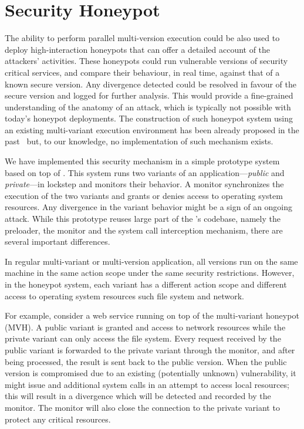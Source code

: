 \section{Security Honeypot}
\label{sec:honeypot}

The ability to perform parallel multi-version execution could be also used to
deploy high-interaction honeypots that can offer a detailed account of the
attackers' activities. These honeypots could run vulnerable versions of
security critical services, and compare their behaviour, in real time, against
that of a known secure version.  Any divergence detected could be resolved in
favour of the secure version and logged for further analysis.  This would
provide a fine-grained understanding of the anatomy of an attack, which is
typically not possible with today's honeypot deployments. The construction
of such honeypot system using an existing multi-variant execution environment
has been already proposed in the past~\cite{jackson10} but, to our knowledge,
no implementation of such mechanism exists.

We have implemented this security mechanism in a simple prototype system based
on top of \varan. This system runs two variants of an
application---\emph{public} and \emph{private}---in lockstep and monitors their
behavior. A monitor synchronizes the execution of the two variants and grants
or denies access to operating system resources. Any divergence in the variant
behavior might be a sign of an ongoing attack. While this prototype reuses
large part of the \varan's codebase, namely the preloader, the monitor and the
system call interception mechanism, there are several important differences.

In regular multi-variant or multi-version application, all versions run on the
same machine in the same action scope under the same security restrictions.
However, in the honeypot system, each variant has a different action scope and
different access to operating system resources such file system and network.

For example, consider a web service running on top of the multi-variant
honeypot (MVH). A public variant is granted and access to network resources
while the private variant can only access the file system. Every request
received by the public variant is forwarded to the private variant through the
monitor, and after being processed, the result is sent back to the public
version. When the public version is compromised due to an existing (potentially
unknown) vulnerability, it might issue and additional system calls in an
attempt to access local resources; this will result in a divergence which will
be detected and recorded by the monitor. The monitor will also close the
connection to the private variant to protect any critical resources.


